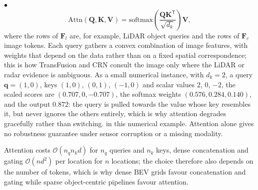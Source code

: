 \documentclass[graybox,envcountchap]{style/SNmono}
\newenvironment{list4a}{
  \begin{list}{$\bullet$}{
      \setlength{\itemsep}{0.05cm}
      \setlength{\labelsep}{0.2cm}
      \setlength{\labelwidth}{0.3cm}
      \setlength{\parsep}{0in}
      \setlength{\parskip}{0in}
      \setlength{\topsep}{0in}
      \setlength{\partopsep}{0in}
      \setlength{\leftmargin}{0.16in}}}
      {\end{list}}
\providecommand{\DIFadd}[1]{{\protect\color{blue} #1}} %
\providecommand{\DIFdel}[1]{{\protect\color{red} #1}} %
\providecommand{\DIFaddbegin}{} %
\providecommand{\DIFaddend}{} %
\providecommand{\DIFdelbegin}{} %
\providecommand{\DIFdelend}{} %
\begin{document}
\begin{list4a}
\begin{equation}
    \mathrm{Attn}(\mathbf{Q},\mathbf{K},\mathbf{V})=\mathrm{softmax}\!\left(\frac{\mathbf{Q}\mathbf{K}^{\mathsf T}}{\sqrt{d_k}}\right)\mathbf{V},
    \label{eq:cross-attention}
    \end{equation}
    where the rows of $\mathbf{F}_l$ are, for example, LiDAR object queries and the rows of $\mathbf{F}_c$ image tokens. Each query gathers a convex combination of image features, with weights that depend on the data rather than on a fixed spatial correspondence; this is how TransFusion \cite{bai2022_transfusion} and CRN \cite{kim2023_crn} consult the image only where the LiDAR or radar evidence is ambiguous. As a small numerical instance, with $d_k=2$, a query $\mathbf{q}=(1,0)$, keys $(1,0)$, $(0,1)$, $(-1,0)$ and scalar values $2$, $0$, $-2$, the scaled scores are $(0.707,0,-0.707)$, the softmax weights $(0.576,0.284,0.140)$, and the output $0.872$: the query is pulled towards the value whose key resembles it, but never ignores the others entirely, \DIFdelbegin \DIFdel{which is why attention degrades gracefully rather than switching. }\DIFdelend \DIFaddbegin \DIFadd{in this numerical example. Attention alone gives no robustness guarantee under sensor corruption or a missing modality.
}\DIFaddend \end{list4a}
Attention costs $\mathcal{O}(n_q n_k d)$ for $n_q$ queries and $n_k$ keys, \DIFaddbegin \DIFadd{dense }\DIFaddend concatenation and gating $\mathcal{O}(n d^{2})$ \DIFdelbegin \DIFdel{per location}\DIFdelend \DIFaddbegin \DIFadd{for $n$ locations}\DIFaddend ; the choice therefore also depends on the number of tokens, which is why dense BEV grids favour concatenation and gating while sparse object-centric pipelines favour attention.
\end{document}
